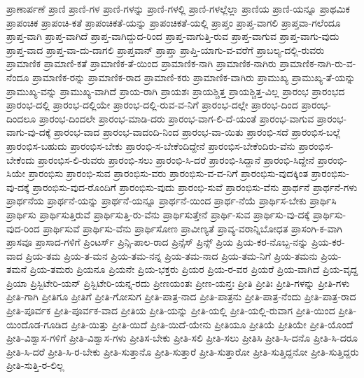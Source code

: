 {ಪ್ರಾಣಾರ್ಪಣೆ
ಪ್ರಾಣಿ
ಪ್ರಾಣಿ-ಗಳ
ಪ್ರಾಣಿ-ಗಳನ್ನು
ಪ್ರಾಣಿ-ಗಳಲ್ಲಿ
ಪ್ರಾಣಿ-ಗಳಲ್ಲೆಲ್ಲಾ
ಪ್ರಾಣಿಯ
ಪ್ರಾಣಿ-ಯನ್ನೂ
ಪ್ರಾಥಮಿಕ
ಪ್ರಾಪಂಚಿಕ
ಪ್ರಾಪಂಚಿ-ಕತೆ
ಪ್ರಾಪಂಚಿಕತೆ-ಯನ್ನು
ಪ್ರಾಪಂಚಿಕತೆ-ಯಲ್ಲಿ
ಪ್ರಾಪ್ತಂ
ಪ್ರಾಪ್ತ-ವಾಗಲಿ
ಪ್ರಾಪ್ತವಾ-ಗಲೆಂದೂ
ಪ್ರಾಪ್ತ-ವಾಗಿ
ಪ್ರಾಪ್ತ-ವಾಗಿದೆ
ಪ್ರಾಪ್ತ-ವಾಗಿದ್ದುದ-ರಿಂದ
ಪ್ರಾಪ್ತ-ವಾಗುತ್ತಿ-ರುವ
ಪ್ರಾಪ್ತ-ವಾಗುವ
ಪ್ರಾಪ್ತ-ವಾಗು-ವುದು
ಪ್ರಾಪ್ತ-ವಾದ
ಪ್ರಾಪ್ತ-ವಾ-ದು-ದಾಗಲಿ
ಪ್ರಾಪ್ತವಾನ್
ಪ್ರಾಪ್ತಾ
ಪ್ರಾಪ್ತಿ-ಯಾಗು-ವ-ವರೆಗೆ
ಪ್ರಾಬಲ್ಯ-ದಲ್ಲಿ-ರುವರು
ಪ್ರಾಮಾಣಿಕ
ಪ್ರಾಮಾಣಿ-ಕತೆ
ಪ್ರಾಮಾಣಿಕ-ತೆ-ಯಿಂದ
ಪ್ರಾಮಾಣಿಕ-ನಾಗಿ
ಪ್ರಾಮಾಣಿಕ-ನಾಗಿರು
ಪ್ರಾಮಾಣಿಕ-ನಾಗಿ-ರು-ವ-ನೆಂದೂ
ಪ್ರಾಮಾಣಿಕ-ರನ್ನು
ಪ್ರಾಮಾಣಿಕ-ರಾದ
ಪ್ರಾಮಾಣಿ-ಕರು
ಪ್ರಾಮಾಣಿಕ-ವಾಗಿರು
ಪ್ರಾಮುಖ್ಯ
ಪ್ರಾಮುಖ್ಯ-ತೆ-ಯನ್ನು
ಪ್ರಾಮುಖ್ಯ-ವನ್ನು
ಪ್ರಾಮುಖ್ಯ-ವಾಗಿದೆ
ಪ್ರಾಯ-ರಾಗಿ
ಪ್ರಾಯಶಃ
ಪ್ರಾಯಶ್ಚಿತ್ತ
ಪ್ರಾಯಶ್ಚಿತ್ತ-ವಿಲ್ಲ
ಪ್ರಾರಂಭ
ಪ್ರಾರಂಭದ
ಪ್ರಾರಂಭ-ದಲ್ಲಿ
ಪ್ರಾರಂಭ-ದಲ್ಲಿಯೇ
ಪ್ರಾರಂಭ-ದಲ್ಲಿ-ರುವ-ವ-ನಿಗೆ
ಪ್ರಾರಂಭ-ದಲ್ಲೇ
ಪ್ರಾರಂಭ-ದಿಂದ
ಪ್ರಾರಂಭ-ದಿಂದಲೂ
ಪ್ರಾರಂಭ-ದಿಂದಲೇ
ಪ್ರಾರಂಭ-ಮಾಡಿ-ದರು
ಪ್ರಾರಂಭ-ವಾಗ-ಲಿ-ದೆ-ಯಂತೆ
ಪ್ರಾರಂಭ-ವಾಗುವ
ಪ್ರಾರಂಭ-ವಾಗು-ವು-ದಕ್ಕೆ
ಪ್ರಾರಂಭ-ವಾದ
ಪ್ರಾರಂಭ-ವಾದಂದಿ-ನಿಂದ
ಪ್ರಾರಂಭ-ವಾ-ಯಿತು
ಪ್ರಾರಂಭಿ-ಸದೆ
ಪ್ರಾರಂಭಿಸ-ಬಲ್ಲೆ
ಪ್ರಾರಂಭಿಸ-ಬಹುದು
ಪ್ರಾರಂಭಿಸ-ಬೇಕು
ಪ್ರಾರಂಭಿ-ಸ-ಬೇಕೆಂದಿದ್ದೇನೆ
ಪ್ರಾರಂಭಿಸ-ಬೇಕೆಂದಿರು-ವೆನು
ಪ್ರಾರಂಭಿಸ-ಬೇಕೆಂದು
ಪ್ರಾರಂಭಿಸ-ಲಿ-ರುವರು
ಪ್ರಾರಂಭಿ-ಸಲು
ಪ್ರಾರಂಭಿ-ಸಿ-ದರೆ
ಪ್ರಾರಂಭಿ-ಸಿದ್ದಾನೆ
ಪ್ರಾರಂಭಿ-ಸಿದ್ದೇನೆ
ಪ್ರಾರಂಭಿ-ಸಿಯೇ
ಪ್ರಾರಂಭಿಸು
ಪ್ರಾರಂಭಿ-ಸುವ
ಪ್ರಾರಂಭಿಸು-ವರು
ಪ್ರಾರಂಭಿಸು-ವ-ವ-ನಿಗೆ
ಪ್ರಾರಂಭಿಸು-ವುದಕ್ಕಿಂತ
ಪ್ರಾರಂಭಿಸು-ವು-ದಕ್ಕೆ
ಪ್ರಾರಂಭಿಸು-ವುದ-ರೊಂದಿಗೆ
ಪ್ರಾರಂಭಿಸು-ವುದು
ಪ್ರಾರಂಭಿ-ಸುವೆ
ಪ್ರಾರಂಭಿಸು-ವೆನು
ಪ್ರಾರ್ಥನೆ
ಪ್ರಾರ್ಥನೆ-ಗಳು
ಪ್ರಾರ್ಥನೆಯ
ಪ್ರಾರ್ಥನೆ-ಯನ್ನು
ಪ್ರಾರ್ಥನೆ-ಯನ್ನೂ
ಪ್ರಾರ್ಥನೆ-ಯಿಂದ
ಪ್ರಾರ್ಥ-ನೆಯೆ
ಪ್ರಾರ್ಥಿಸ-ಬೇಕು
ಪ್ರಾರ್ಥಿಸಿ
ಪ್ರಾರ್ಥಿಸು
ಪ್ರಾರ್ಥಿಸುತ್ತಿರುವೆ
ಪ್ರಾರ್ಥಿಸುತ್ತಿ-ರು-ವೆನು
ಪ್ರಾರ್ಥಿಸುತ್ತೇನೆ
ಪ್ರಾರ್ಥಿ-ಸುವ
ಪ್ರಾರ್ಥಿಸು-ವು-ದಕ್ಕೆ
ಪ್ರಾರ್ಥಿಸು-ವುದ-ರಿಂದ
ಪ್ರಾರ್ಥಿಸುವೆ
ಪ್ರಾರ್ಥಿಸು-ವೆನು
ಪ್ರಾರ್ಥಿಸೋಣ
ಪ್ರಾವೀಣ್ಯತೆ
ಪ್ರಾವ್ಯ-ವರಾನ್ನಿಬೋಧತ
ಪ್ರಾಸಂಗಿ-ಕ-ವಾಗಿ
ಪ್ರಾಸವೂ
ಪ್ರಾಸಾದ-ಗಳಿಗೆ
ಪ್ರಿಂಟರ್ಸ್
ಪ್ರಿನ್ಸಿ-ಪಾಲ-ರಾದ
ಪ್ರಿನ್ಸೆಸ್
ಪ್ರಿನ್ಸ್
ಪ್ರಿಯ
ಪ್ರಿಯ-ಕರ-ನೊಬ್ಬ-ನನ್ನು
ಪ್ರಿಯ-ಕರ-ವಾದ
ಪ್ರಿಯ-ತಮ
ಪ್ರಿಯ-ತ-ಮನ
ಪ್ರಿಯ-ತಮ-ನನ್ನ
ಪ್ರಿಯ-ತಮ-ನಾದ
ಪ್ರಿಯ-ತಮ-ನಿಗೆ
ಪ್ರಿಯ-ತಮನು
ಪ್ರಿಯ-ತಮನೆ
ಪ್ರಿಯ-ತಮರು
ಪ್ರಿಯನೂ
ಪ್ರಿಯನೇ
ಪ್ರಿಯ-ಭಕ್ತರು
ಪ್ರಿಯರ
ಪ್ರಿಯ-ರ-ವರ
ಪ್ರಿಯರೆ
ಪ್ರಿಯ-ವಾಗಿದೆ
ಪ್ರಿಯ-ವೃದ್ದ
ಪ್ರಿಯಾ
ಪ್ರಿಸ್ಬಿಟೇರಿ-ಯನ್
ಪ್ರಿಸ್ಬಿಟೇರಿ-ಯನ್ನ-ರದು
ಪ್ರೀಣಯಂತಃ
ಪ್ರೀಣ-ಯನ್ತಃ
ಪ್ರೀತಿ
ಪ್ರೀತಿಃ
ಪ್ರೀತಿ-ಗಳನ್ನು
ಪ್ರೀತಿ-ಗಳು
ಪ್ರೀತಿ-ಗಾಗಿ
ಪ್ರೀತಿಗೂ
ಪ್ರೀತಿಗೆ
ಪ್ರೀತಿ-ಗೋಸುಗ
ಪ್ರೀತಿ-ಪಾತ್ರ-ನಾದ
ಪ್ರೀತಿ-ಪಾತ್ರನು
ಪ್ರೀತಿ-ಪಾತ್ರ-ನೆಂದು
ಪ್ರೀತಿ-ಪಾತ್ರ-ರಾದ
ಪ್ರೀತಿ-ಪೂರ್ವಕ
ಪ್ರೀತಿ-ಪೂರ್ವಕ-ವಾದ
ಪ್ರೀತಿಯ
ಪ್ರೀತಿ-ಯನ್ನು
ಪ್ರೀತಿ-ಯಲ್ಲಿ
ಪ್ರೀತಿ-ಯಲ್ಲಿ-ರುವಾಗ
ಪ್ರೀತಿ-ಯಿಂದ
ಪ್ರೀತಿ-ಯಿಂದೊಡ-ಗೂಡಿದ
ಪ್ರೀತಿ-ಯಿತ್ತು
ಪ್ರೀತಿ-ಯಿದೆ
ಪ್ರೀತಿ-ಯಿದೆ-ಯೇನು
ಪ್ರೀತಿಯೂ
ಪ್ರೀತಿಯೆ
ಪ್ರೀತಿಯೇ
ಪ್ರೀತಿ-ಯೊಂದೆ
ಪ್ರೀತಿ-ವಿಶ್ವಾಸ-ಗಳಿಗೆ
ಪ್ರೀತಿ-ವಿಶ್ವಾಸ-ಗಳು
ಪ್ರೀತಿಸ-ಬೇಕು
ಪ್ರೀತಿ-ಸಲಿ
ಪ್ರೀತಿ-ಸಲು
ಪ್ರೀತಿಸಿ
ಪ್ರೀತಿ-ಸಿ-ದನೊ
ಪ್ರೀತಿ-ಸಿ-ದರೂ
ಪ್ರೀತಿ-ಸಿ-ದರೆ
ಪ್ರೀತಿ-ಸಿ-ರ-ಬೇಕು
ಪ್ರೀತಿ-ಸುತ್ತಾನೊ
ಪ್ರೀತಿ-ಸುತ್ತಾರೆ
ಪ್ರೀತಿ-ಸುತ್ತಾರೋ
ಪ್ರೀತಿ-ಸುತ್ತಿದ್ದನೋ
ಪ್ರೀತಿ-ಸುತ್ತಿದ್ದರು
ಪ್ರೀತಿ-ಸುತ್ತಿ-ರ-ಲಿಲ್ಲ
}
